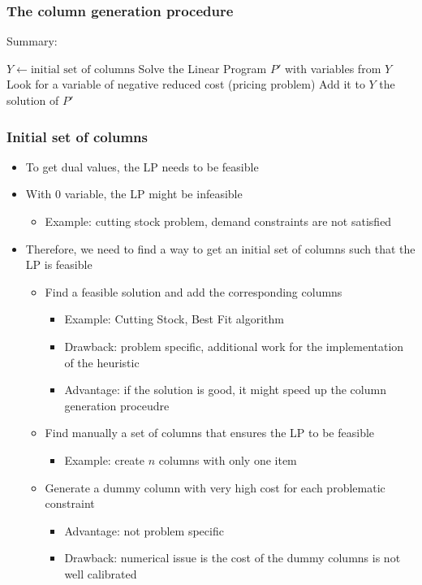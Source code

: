\documentclass[10pt]{beamer}
\begin{document}
\begin{frame}
  \frametitle{The column generation procedure}
  
  Summary:
  \begin{algorithmic}
    \State $Y \gets \text{initial set of columns}$
    \State Solve the Linear Program $P'$ with variables from $Y$
    \State Look for a variable of negative reduced cost (\alert{pricing problem})
    \State Add it to $Y$
    \Else
    \State \Return the solution of $P'$
    \EndIf
    \EndWhile
    \EndFunction
  \end{algorithmic}
\end{frame}

\begin{frame}
  \frametitle{Initial set of columns}

  \begin{itemize}
    \item To get dual values, the LP needs to be feasible
    \item With $0$ variable, the LP might be infeasible
      \begin{itemize}
        \item Example: cutting stock problem, demand constraints are not satisfied
      \end{itemize}
    \item Therefore, we need to find a way to get an initial set of columns such that the LP is feasible
      \begin{itemize}
        \item Find a feasible solution and add the corresponding columns
          \begin{itemize}
            \item Example: Cutting Stock, Best Fit algorithm
            \item Drawback: problem specific, additional work for the implementation of the heuristic
            \item Advantage: if the solution is good, it might speed up the column generation proceudre
          \end{itemize}
        \item Find manually a set of columns that ensures the LP to be feasible
          \begin{itemize}
            \item Example: create $n$ columns with only one item
          \end{itemize}
        \item Generate a dummy column with very high cost for each problematic constraint
          \begin{itemize}
            \item Advantage: not problem specific
            \item Drawback: numerical issue is the cost of the dummy columns is not well calibrated
          \end{itemize}
      \end{itemize}
  \end{itemize}
\end{frame}
\end{document}
